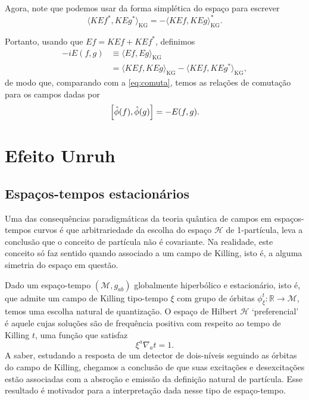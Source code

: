 \documentclass[12pt]{article}
\newcommand{\m}{\mathcal{M}}
\newcommand{\innerkg}[2]{\langle#1,#2\rangle_{\text{KG}}}
\newcommand{\h}{\mathcal{H}}
\begin{document}
Agora, note que podemos usar da forma simplética do espaço para escrever
\begin{equation}
    \innerkg{KEf^*}{KEg^*}=-\innerkg{KEf}{KEg}^*.
\end{equation}

Portanto, usando que \(Ef=KEf+KEf^*\), definimos
\begin{subequations}
    \begin{align}
        -iE(f,g)&\equiv\innerkg{Ef}{Eg}\\
        &=\innerkg{KEf}{KEg}-\innerkg{KEf}{KEg^*},
        \label{eq:def-E}
    \end{align}
\end{subequations}
de modo que, comparando com a \cref{eq:comuta}, temos as relações de comutação para os campos dadas por
\begin{equation}
    \relax\left[\hat{\phi}(f),\hat{\phi}(g)\right]=-E(f,g).
\end{equation}


\section{Efeito Unruh}
\subsection*{Espaços-tempos estacionários}
Uma das consequências paradigmáticas da teoria quântica de campos em espaços-tempos curvos é que arbitrariedade da escolha do espaço \(\h\) de 1-partícula, leva a conclusão que o conceito de partícula não é covariante. Na realidade, este conceito só faz sentido quando associado a um campo de Killing, isto é, a alguma simetria do espaço em questão.

Dado um espaço-tempo \((\m,g_{ab})\) globalmente hiperbólico e estacionário, isto é, que admite um campo de Killing tipo-tempo \(\xi\) com grupo de órbitas \(\phi_\xi^t:\mathbb{R}\to\m\), temos uma escolha natural de quantização. O espaço de Hilbert \(\h\) \enquote*{preferencial} é aquele cujas soluções são de frequência positiva com respeito ao tempo de Killing \(t\), uma função que satisfaz
\begin{equation}
    \xi^a\nabla_at=1.
\end{equation}
A saber, estudando a resposta de um detector de dois-níveis seguindo as órbitas do campo de Killing, chegamos a conclusão de que suas excitações e desexcitações estão associadas com a absroção e emissão da definição natural de partícula. Esse resultado é motivador para a interpretação dada nesse tipo de espaço-tempo.
\end{document}
